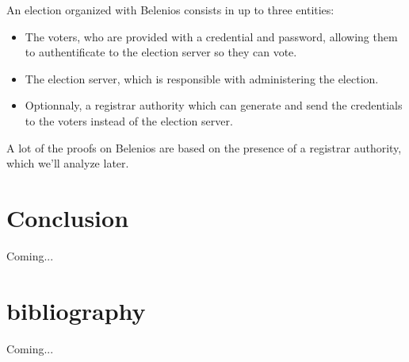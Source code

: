 \documentclass[12pt, a4paper]{report}
\begin{document}
An election organized with Belenios consists in up to three entities:
\begin{itemize}
\item The voters, who are provided with a credential and password, allowing them to authentificate
to the election server so they can vote.
\item The election server, which is responsible with administering the election.
\item Optionnaly, a registrar authority which can generate and send the credentials to the voters 
instead of the election server.
\end{itemize}

A lot of the proofs on Belenios are based on the presence of a registrar authority, which we'll analyze later.



\section{Conclusion}

Coming...

\section{bibliography}


Coming...
\end{document}
